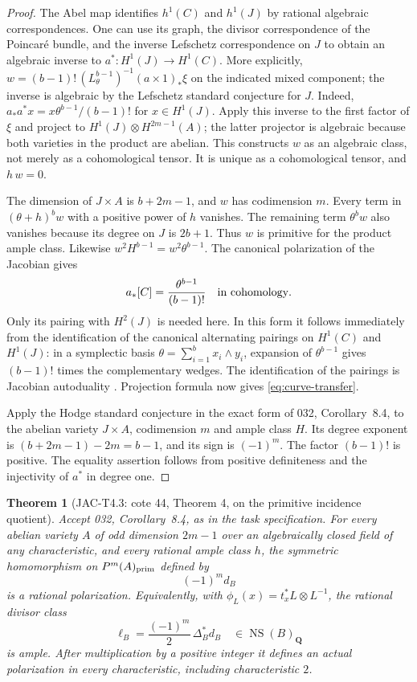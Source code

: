 \documentclass[11pt,a4paper]{article}
\newtheorem{theorem}{Theorem}[section]
\begin{document}
\begin{proof}
The Abel map identifies $h^1(C)$ and $h^1(J)$ by rational algebraic
correspondences. One can use its graph, the divisor correspondence of
the Poincar\'e bundle, and the inverse Lefschetz correspondence on $J$
to obtain an algebraic inverse to $a^*:H^1(J)\to H^1(C)$.
More explicitly, $w=(b-1)!\,(L_\theta^{b-1})^{-1}(a\times1)_*\xi$ on the indicated mixed component; the inverse is algebraic by the Lefschetz standard conjecture for $J$. Indeed, $a_*a^*x=x\theta^{b-1}/(b-1)!$ for $x\in H^1(J)$. Apply this inverse to the first factor of $\xi$ and project to
$H^1(J)\otimes H^{2m-1}(A)$; the latter projector is algebraic because
both varieties in the product are abelian. This constructs $w$ as an
algebraic class, not merely as a cohomological tensor. It is unique as a
cohomological tensor, and $h\,w=0$.

The dimension of $J\times A$ is $b+2m-1$, and $w$ has codimension $m$.
Every term in $(\theta+h)^bw$ with a positive power of $h$ vanishes.
The remaining term $\theta^bw$ also vanishes because its degree on $J$
is $2b+1$. Thus $w$ is primitive for the product ample class.
Likewise $w^2H^{b-1}=w^2\theta^{b-1}$.
The canonical polarization of the Jacobian gives
\[
 a_*[C]=\frac{\theta^{b-1}}{(b-1)!}
 \quad\hbox{in cohomology}.
\]
Only its pairing with $H^2(J)$ is needed here. In this form it follows
immediately from the identification of the canonical alternating
pairings on $H^1(C)$ and $H^1(J)$: in a symplectic basis
$\theta=\sum_{i=1}^b x_i\wedge y_i$, expansion of
$\theta^{b-1}$ gives $(b-1)!$ times the complementary wedges.
The identification of the pairings is Jacobian autoduality
\cite[Chapter~III, Theorem~6.8 and Summary~6.11]{MilneAV}.
Projection formula now gives \eqref{eq:curve-transfer}.

Apply the Hodge standard conjecture in the exact form of 032,
Corollary~8.4, to the abelian variety $J\times A$, codimension $m$ and
ample class $H$. Its degree exponent is
$(b+2m-1)-2m=b-1$, and its sign is $(-1)^m$.
The factor $(b-1)!$ is positive. The equality assertion follows from
positive definiteness and the injectivity of $a^*$ in degree one.
\end{proof}

\begin{theorem}[JAC-T4.3: cote 44, Theorem 4, on the primitive incidence quotient]
\label{thm:T4}
Accept 032, Corollary~8.4, as in the task specification. For every
abelian variety $A$ of odd dimension $2m-1$ over an algebraically closed
field of any characteristic, and every rational ample class $h$, the
symmetric homomorphism on $P^m(A)_{\rm prim}$ defined by
\[
 (-1)^m d_B
\]
is a rational polarization. Equivalently, with
$\phi_L(x)=t_x^*L\otimes L^{-1}$, the rational divisor class
\begin{equation}\label{eq:T4-divisor}
 \ell_B=\frac{(-1)^m}{2}\,\Delta_B^*d_B
 \quad\in\operatorname{NS}(B)_{\mathbf Q}
\end{equation}
is ample. After multiplication by a positive integer it defines an
actual polarization in every characteristic, including characteristic
$2$.
\end{theorem}
\end{document}
